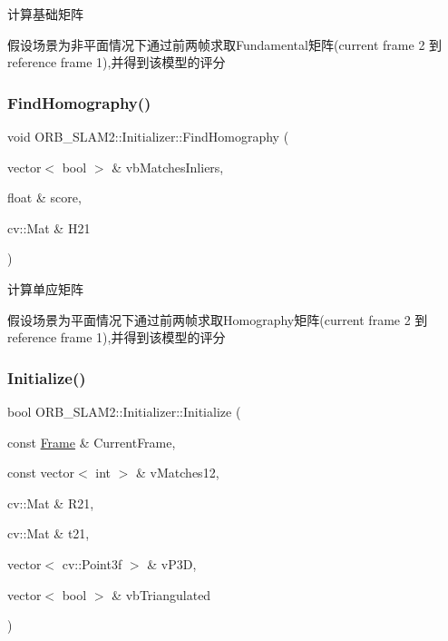 计算基础矩阵 

假设场景为非平面情况下通过前两帧求取\+Fundamental矩阵(current frame 2 到 reference frame 1),并得到该模型的评分 \mbox{\label{class_o_r_b___s_l_a_m2_1_1_initializer_a5b0465b2affed7453d30dd85672e9093}} 
\subsubsection{\texorpdfstring{Find\+Homography()}{FindHomography()}}
{\footnotesize\ttfamily void O\+R\+B\+\_\+\+S\+L\+A\+M2\+::\+Initializer\+::\+Find\+Homography (\begin{DoxyParamCaption}\item[{vector$<$ bool $>$ \&}]{vb\+Matches\+Inliers,  }\item[{float \&}]{score,  }\item[{cv\+::\+Mat \&}]{H21 }\end{DoxyParamCaption})\hspace{0.3cm}{\ttfamily [private]}}



计算单应矩阵 

假设场景为平面情况下通过前两帧求取\+Homography矩阵(current frame 2 到 reference frame 1),并得到该模型的评分 \mbox{\label{class_o_r_b___s_l_a_m2_1_1_initializer_a40d41840e2bdb7199ab024871d028c2c}} 
\subsubsection{\texorpdfstring{Initialize()}{Initialize()}}
{\footnotesize\ttfamily bool O\+R\+B\+\_\+\+S\+L\+A\+M2\+::\+Initializer\+::\+Initialize (\begin{DoxyParamCaption}\item[{const \mbox{\hyperlink{class_o_r_b___s_l_a_m2_1_1_frame}{Frame}} \&}]{Current\+Frame,  }\item[{const vector$<$ int $>$ \&}]{v\+Matches12,  }\item[{cv\+::\+Mat \&}]{R21,  }\item[{cv\+::\+Mat \&}]{t21,  }\item[{vector$<$ cv\+::\+Point3f $>$ \&}]{v\+P3D,  }\item[{vector$<$ bool $>$ \&}]{vb\+Triangulated }\end{DoxyParamCaption})}



